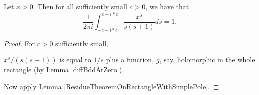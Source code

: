 \begin{lemma}[residueAtZero]
\label{residueAtZero}
\leanok
Let $x>0$. Then for all sufficiently small $c>0$, we have that
  $$
  \frac1{2\pi i}
  \int_{-c-i*c}^{c+ i*c}\frac{x^s}{s(s+1)}ds = 1.
  $$
\end{lemma}
\begin{proof}
\leanok
For $c>0$ sufficiently small,

$x^s/(s(s+1))$ is equal to $1/s$ plus a function, $g$, say,
  holomorphic in the whole rectangle (by Lemma \ref{diffBddAtZero}).

Now apply Lemma \ref{ResidueTheoremOnRectangleWithSimplePole}.
\end{proof}
